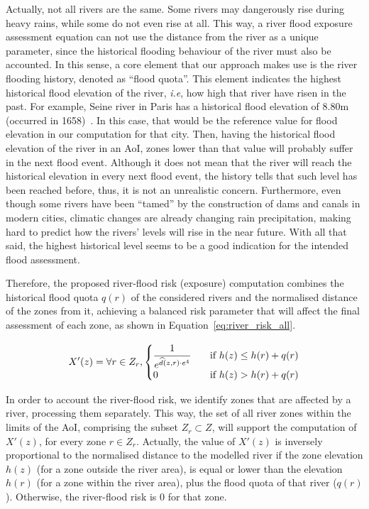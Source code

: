 \begin{refsection}
Actually, not all rivers are the same. Some rivers may dangerously rise during heavy rains, while some do not even rise at all. This way, a river flood exposure assessment equation can not use the distance from the river as a unique parameter, since the historical flooding behaviour of the river must also be accounted. In this sense, a core element that our approach makes use is the river flooding history, denoted as ``flood quota''. This element indicates the highest historical flood elevation of the river, \textit{i.e}, how high that river have risen in the past. For example, Seine river in Paris has a historical flood elevation of 8.80m (occurred in 1658)~\cite{flood_seine}. In this case, that would be the reference value for flood elevation in our computation for that city. Then, having the historical flood elevation of the river in an AoI, zones lower than that value will probably suffer in the next flood event. Although it does not mean that the river will reach the historical elevation in every next flood event, the history tells that such level has been reached before, thus, it is not an unrealistic concern. Furthermore, even though some rivers have been ``tamed'' by the construction of dams and canals in modern cities, climatic changes are already changing rain precipitation, making hard to predict how the rivers' levels will rise in the near future. With all that said, the highest historical level seems to be a good indication for the intended flood assessment. 

Therefore, the proposed river-flood risk (exposure) computation combines the historical flood quota $q(r)$ of the considered rivers and the normalised distance of the zones from it, achieving a balanced risk parameter that will affect the final assessment of each zone, as shown in Equation~\ref{eq:river_risk_all}.

\begin{equation}
  \label{eq:river_risk_all}
  \begin{split}
    X'(z) = \forall r \in Z_r, 
    \begin{cases}
      \cfrac{1}{e^{\widehat{d}(z, r) \cdot e^4}}    & \quad \text{if } h(z) \leq h(r) + q(r) \\
      0                                             & \quad \text{if } h(z) > h(r) + q(r)
    \end{cases}
  \end{split}
\end{equation}

In order to account the river-flood risk, we identify zones that are affected by a river, processing them separately. This way, the set of all river zones within the limits of the AoI, comprising the subset $Z_r \subset Z$, will support the computation of $X'(z)$, for every zone $r \in Z_r$. Actually, the value of $X'(z)$ is inversely proportional to the normalised distance to the modelled river if the zone elevation $h(z)$ (for a zone outside the river area), is equal or lower than the elevation $h(r)$ (for a zone within the river area), plus the flood quota of that river ($q(r)$). Otherwise, the river-flood risk is 0 for that zone. 


\end{refsection}
